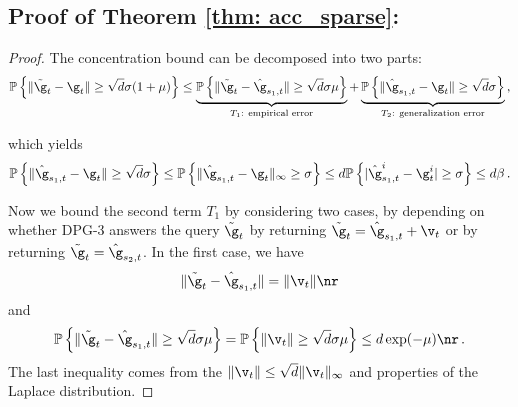 \subsection{Proof of Theorem \ref{thm: acc_sparse}:}

\theoaccsparse*

\begin{proof}
The concentration bound can be decomposed into two parts:
\begin{align}\notag
\mathbb{P}\left\{ \|\tilde \g_t - \g_t\| \geq \sqrt{d}\sigma(1+\mu)\right\}  \leq \underbrace{ \mathbb{P}\left\{ \|\tilde \g_t - \hat \g_{s_1,t}\| \geq \sqrt{d}\sigma \mu\right\} }_{\text{$T_1$: empirical error}} +  \underbrace{\mathbb{P}\left\{ \|\hat \g_{s_1,t} - \g_t\| \geq \sqrt{d}\sigma \right\}}_{\text{$T_2$: generalization error}} \, ,
\end{align}

which yields
\begin{align} \label{eq: gen2}
    \mathbb{P}\left\{ \|\hat \g_{s_1,t} - \g_t\| \geq  \sqrt{d}\sigma \right\} \leq \mathbb{P}\left\{ \|\hat \g_{s_1,t} - \g_t\|_\infty \geq  \sigma \right\} \leq d \mathbb{P}\left\{ |\hat \g_{s_1,t}^i - \g_t^i| \geq  \sigma \right\} \leq d\beta  \, .
\end{align}

Now we bound the second term $T_1$ by considering two cases, by depending on whether DPG-3 answers the query $\tilde \g_t$ by 
returning $\tilde \g_t = \hat \g_{s_1,t} + \v_t$ or by returning $\tilde \g_t = \hat \g_{s_2,t}$. In the first case, we have 
\begin{equation}
    \|\tilde \g_t - \hat \g_{s_1,t}\| = \|\v_t\| \nr
\end{equation}
and
\begin{equation}
\begin{split}
    \mathbb{P}\left\{ \|\tilde \g_t - \hat \g_{s_1,t}\| \geq \sqrt{d}\sigma \mu  \right\}  = \mathbb{P} \left\{ \|\v_t\| \geq  \sqrt{d}\sigma \mu \right\} \leq d \exp(-\mu) \nr \, .
\end{split}
\end{equation}
The last inequality comes from the $\|\v_t\| \leq \sqrt{d}\|\v_t\|_\infty$ and properties of the Laplace distribution. 


\end{proof}
